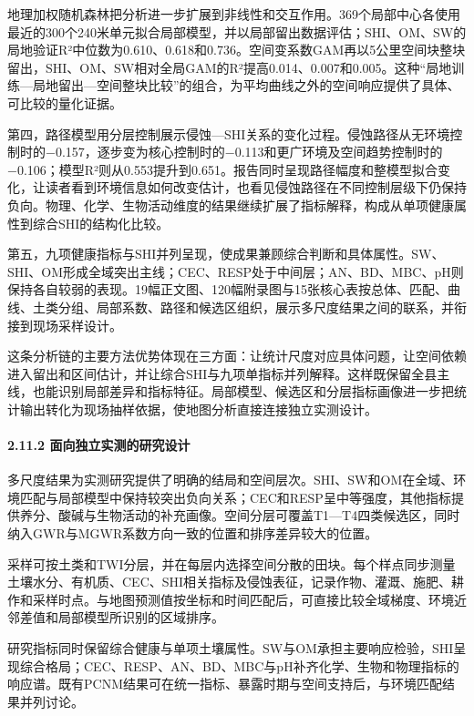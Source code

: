\documentclass[
  11pt,
  a4paper,
]{ctexart}
\begin{document}
地理加权随机森林把分析进一步扩展到非线性和交互作用。369个局部中心各使用最近的300个240米单元拟合局部模型，并以局部留出数据评估；SHI、OM、SW的局地验证R²中位数为0.610、0.618和0.736。空间变系数GAM再以5公里空间块整块留出，SHI、OM、SW相对全局GAM的R²提高0.014、0.007和0.005。这种``局地训练---局地留出---空间整块比较''的组合，为平均曲线之外的空间响应提供了具体、可比较的量化证据。

第四，路径模型用分层控制展示侵蚀---SHI关系的变化过程。侵蚀路径从无环境控制时的−0.157，逐步变为核心控制时的−0.113和更广环境及空间趋势控制时的−0.106；模型R²则从0.553提升到0.651。报告同时呈现路径幅度和整模型拟合变化，让读者看到环境信息如何改变估计，也看见侵蚀路径在不同控制层级下仍保持负向。物理、化学、生物活动维度的结果继续扩展了指标解释，构成从单项健康属性到综合SHI的结构化比较。

第五，九项健康指标与SHI并列呈现，使成果兼顾综合判断和具体属性。SW、SHI、OM形成全域突出主线；CEC、RESP处于中间层；AN、BD、MBC、pH则保持各自较弱的表现。19幅正文图、120幅附录图与15张核心表按总体、匹配、曲线、土类分组、局部系数、路径和候选区组织，展示多尺度结果之间的联系，并衔接到现场采样设计。

这条分析链的主要方法优势体现在三方面：让统计尺度对应具体问题，让空间依赖进入留出和区间估计，并让综合SHI与九项单指标并列解释。这样既保留全县主线，也能识别局部差异和指标特征。局部模型、候选区和分层指标画像进一步把统计输出转化为现场抽样依据，使地图分析直接连接独立实测设计。

\hypertarget{ux9762ux5411ux72ecux7acbux5b9eux6d4bux7684ux7814ux7a76ux8bbeux8ba1}{%
\paragraph{2.11.2
面向独立实测的研究设计}\label{ux9762ux5411ux72ecux7acbux5b9eux6d4bux7684ux7814ux7a76ux8bbeux8ba1}}

多尺度结果为实测研究提供了明确的结局和空间层次。SHI、SW和OM在全域、环境匹配与局部模型中保持较突出负向关系；CEC和RESP呈中等强度，其他指标提供养分、酸碱与生物活动的补充画像。空间分层可覆盖T1---T4四类候选区，同时纳入GWR与MGWR系数方向一致的位置和排序差异较大的位置。

采样可按土类和TWI分层，并在每层内选择空间分散的田块。每个样点同步测量土壤水分、有机质、CEC、SHI相关指标及侵蚀表征，记录作物、灌溉、施肥、耕作和采样时点。与地图预测值按坐标和时间匹配后，可直接比较全域梯度、环境近邻差值和局部模型所识别的区域排序。

研究指标同时保留综合健康与单项土壤属性。SW与OM承担主要响应检验，SHI呈现综合格局；CEC、RESP、AN、BD、MBC与pH补齐化学、生物和物理指标的响应谱。既有PCNM结果可在统一指标、暴露时期与空间支持后，与环境匹配结果并列讨论。
\end{document}
